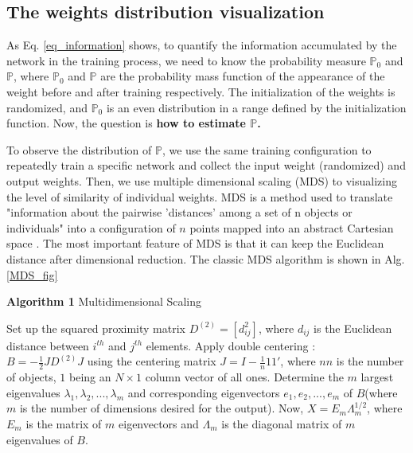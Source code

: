 \documentclass[letterpaper]{article} %
\begin{document}
\subsection{The weights distribution visualization}
As Eq. \ref{eq_information} shows, to quantify the information accumulated by the network in the training process, we need to know the probability measure $\mathbb{P}_0$ and $\mathbb{P}$, where $\mathbb{P}_0$ and $\mathbb{P}$ are the probability mass function of the appearance of the weight before and after training respectively. The initialization of the weights is randomized, and $\mathbb{P}_0$ is an even distribution in a range defined by the initialization function. Now, the question is \textbf{how to estimate $\mathbb{P}$.}

To observe the distribution of $\mathbb{P}$, we use the same training configuration to repeatedly train a specific network and collect the input weight (randomized) and output weights. Then, we use multiple dimensional scaling (MDS) to visualizing the level of similarity of individual weights. MDS is a method used to translate "information about the pairwise 'distances' among a set of n objects or individuals" into a configuration of $n$ points mapped into an abstract Cartesian space \cite{mead1992review}. The most important feature of MDS is that it can keep the Euclidean distance after dimensional reduction. The classic MDS algorithm \cite{wickelmaier2003introduction} is shown in Alg. \ref{MDS_fig}

\begin{algorithm}[htbp]
\caption*{\textbf{Algorithm 1} Multidimensional Scaling}
\begin{algorithmic}[1]
    \STATE Set up the squared proximity matrix $D^{(2)}=\left[d_{i j}^{2}\right]$, where $d_{ij}$ is the Euclidean distance between $i^{th}$ and $j^{th}$ elements.
    \STATE Apply double centering \cite{marden1996analyzing}: \\${\textstyle B=-{\frac {1}{2}}JD^{(2)}J}$ using the centering matrix ${\textstyle J=I-{\frac {1}{n}}11'}$, where ${\textstyle n}{\textstyle n}$ is the number of objects, $1$ being an $N ×1$ column vector of all ones.
    \STATE Determine the ${\textstyle m}$ largest eigenvalues ${\textstyle \lambda _{1},\lambda _{2},...,\lambda _{m}}$ and corresponding eigenvectors ${\textstyle e_{1},e_{2},...,e_{m}}$ of ${\textstyle B}$(where ${\textstyle m}$ is the number of dimensions desired for the output).
    \STATE Now, ${\textstyle X=E_{m}\Lambda _{m}^{1/2}}$, where ${\textstyle E_{m}}$ is the matrix of ${\textstyle m}$ eigenvectors and ${\textstyle \Lambda _{m}}$ is the diagonal matrix of ${\textstyle m}$ eigenvalues of ${\textstyle B}$.
\label{MDS_alg}
\end{algorithmic}
\end{algorithm}
\end{document}
